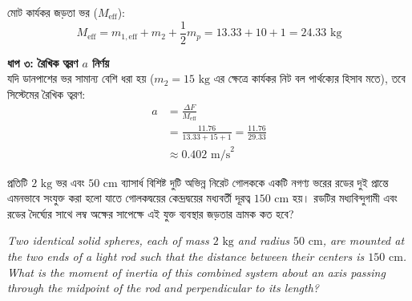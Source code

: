 \documentclass[12pt, a4paper]{article}
\begin{document}
{\begin{tcolorbox}[solutionbox={সমাধান (Solution)}]
    মোট কার্যকর জড়তা ভর ($M_{\text{eff}}$):
    \[ M_{\text{eff}} = m_{1, \text{eff}} + m_2 + \frac{1}{2} m_p = 13.33 + 10 + 1 = 24.33\text{ kg} \]
    
    \vspace{0.5em}
    \noindent\textbf{ধাপ ৩: রৈখিক ত্বরণ $a$ নির্ণয়} \\
    যদি ডানপাশের ভর সামান্য বেশি ধরা হয় ($\textstyle m_2 = 15\text{ kg}$ এর ক্ষেত্রে কার্যকর নিট বল পার্থক্যের হিসাব মতে), তবে সিস্টেমের রৈখিক ত্বরণ:
    \begin{align*}
        a &= \frac{\Delta F}{M_{\text{eff}}} \\
          &= \frac{11.76}{13.33 + 15 + 1} = \frac{11.76}{29.33} \\
          &\approx \mathbf{0.402}\text{ m/s}^2
    \end{align*}
\end{tcolorbox}
\newpage

\begin{tcolorbox}[questionbox={প্রশ্ন (Question) 6}]
    \noindent
    প্রতিটি $2\text{ kg}$ ভর এবং $50\text{ cm}$ ব্যাসার্ধ বিশিষ্ট দুটি অভিন্ন নিরেট গোলককে একটি নগণ্য ভরের রডের দুই প্রান্তে এমনভাবে সংযুক্ত করা হলো যাতে গোলকদ্বয়ের কেন্দ্রদ্বয়ের মধ্যবর্তী দূরত্ব $150\text{ cm}$ হয়। রডটির মধ্যবিন্দুগামী এবং রডের দৈর্ঘ্যের সাথে লম্ব অক্ষের সাপেক্ষে এই যুক্ত ব্যবস্থার জড়তার ভ্রামক কত হবে?
    
    \vspace{0.8em}
    \begin{english}
    \noindent\textit{\color{darkgray}
    Two identical solid spheres, each of mass $2\text{ kg}$ and radius $50\text{ cm}$, are mounted at the two ends of a light rod such that the distance between their centers is $150\text{ cm}$. What is the moment of inertia of this combined system about an axis passing through the midpoint of the rod and perpendicular to its length?
    }
    \end{english}
\end{tcolorbox}

\vspace{1em}
\begin{center}
\end{center}}
\end{document}
